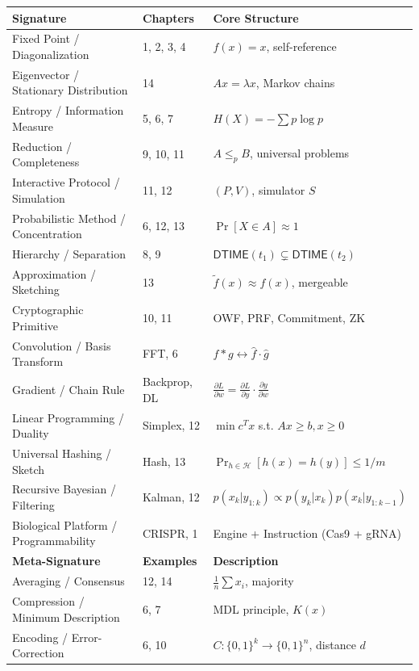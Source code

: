 \begin{center}
\begin{tabularx}{\textwidth}{@{}lXX@{}}
\toprule
\textbf{Signature} & \textbf{Chapters} & \textbf{Core Structure} \\
\midrule
Fixed Point / Diagonalization & 1, 2, 3, 4 & $f(x) = x$, self-reference \\
Eigenvector / Stationary Distribution & 14 & $Ax = \lambda x$, Markov chains \\
Entropy / Information Measure & 5, 6, 7 & $H(X) = -\sum p \log p$ \\
Reduction / Completeness & 9, 10, 11 & $A \le_p B$, universal problems \\
Interactive Protocol / Simulation & 11, 12 & $(P,V)$, simulator $S$ \\
Probabilistic Method / Concentration & 6, 12, 13 & $\Pr[X \in A] \approx 1$ \\
Hierarchy / Separation & 8, 9 & $\mathsf{DTIME}(t_1) \subsetneq \mathsf{DTIME}(t_2)$ \\
Approximation / Sketching & 13 & $\tilde{f}(x) \approx f(x)$, mergeable \\
Cryptographic Primitive & 10, 11 & OWF, PRF, Commitment, ZK \\
Convolution / Basis Transform & FFT, 6 & $f * g \leftrightarrow \hat{f} \cdot \hat{g}$ \\
Gradient / Chain Rule & Backprop, DL & $\frac{\partial L}{\partial w} = \frac{\partial L}{\partial y} \cdot \frac{\partial y}{\partial w}$ \\
Linear Programming / Duality & Simplex, 12 & $\min c^T x$ s.t. $Ax \ge b, x \ge 0$ \\
Universal Hashing / Sketch & Hash, 13 & $\Pr_{h \in \mathcal{H}}[h(x) = h(y)] \le 1/m$ \\
Recursive Bayesian / Filtering & Kalman, 12 & $p(x_k | y_{1:k}) \propto p(y_k | x_k) p(x_k | y_{1:k-1})$ \\
Biological Platform / Programmability & CRISPR, 1 & Engine + Instruction (Cas9 + gRNA) \\
\midrule
\textbf{Meta-Signature} & \textbf{Examples} & \textbf{Description} \\
Averaging / Consensus & 12, 14 & $\frac{1}{n}\sum x_i$, majority \\
Compression / Minimum Description & 6, 7 & MDL principle, $K(x)$ \\
Encoding / Error-Correction & 6, 10 & $C: \{0,1\}^k \to \{0,1\}^n$, distance $d$ \\
\bottomrule
\end{tabularx}
\end{center}

